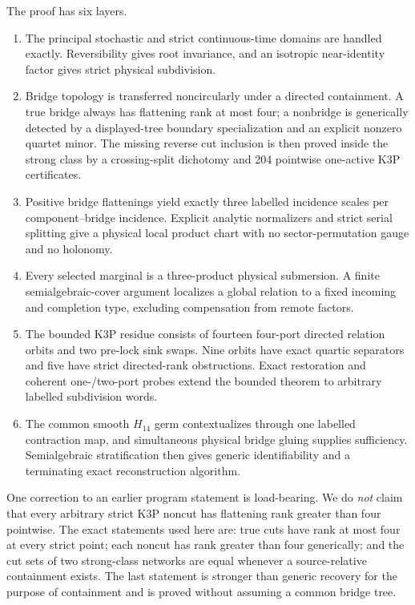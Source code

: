 The proof has six layers.

\begin{enumerate}[label=\textbf{L\arabic*.}]
  \item The principal stochastic and strict continuous-time domains are
        handled exactly.  Reversibility gives root invariance, and an
        isotropic near-identity factor gives strict physical subdivision.
  \item Bridge topology is transferred noncircularly under a directed
        containment.  A true bridge always has flattening rank at most four;
        a nonbridge is generically detected by a displayed-tree boundary
        specialization and an explicit nonzero quartet minor.  The
        missing reverse cut inclusion is then proved inside the strong class
        by a crossing-split dichotomy and 204 pointwise one-active K3P
        certificates.
  \item Positive bridge flattenings yield exactly three labelled incidence
        scales per component--bridge incidence.  Explicit analytic
        normalizers and strict serial splitting give a physical local product
        chart with no sector-permutation gauge and no holonomy.
  \item Every selected marginal is a three-product physical submersion.  A
        finite semialgebraic-cover argument localizes a global relation to a
        fixed incoming and completion type, excluding compensation from
        remote factors.
  \item The bounded K3P residue consists of fourteen four-port directed
        relation orbits and two pre-lock sink swaps.  Nine orbits have exact
        quartic separators and five have strict directed-rank obstructions.
        Exact restoration and coherent one-/two-port probes extend the
        bounded theorem to arbitrary labelled subdivision words.
  \item The common smooth \(H_{14}\) germ contextualizes through one labelled
        contraction map, and simultaneous physical bridge gluing supplies
        sufficiency.  Semialgebraic stratification then gives generic
        identifiability and a terminating exact reconstruction algorithm.
\end{enumerate}

One correction to an earlier program statement is load-bearing.  We do
\emph{not} claim that every arbitrary strict K3P noncut has flattening rank
greater than four pointwise.  The exact statements used here are: true cuts
have rank at most four at every strict point; each noncut has rank greater
than four generically; and the cut sets of two strong-class networks are
equal whenever a source-relative containment exists.  The last statement is
stronger than generic recovery for the purpose of containment and is proved
without assuming a common bridge tree.


